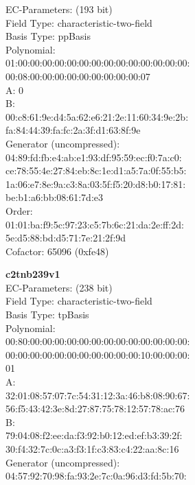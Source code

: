 EC-Parameters: (193 bit)\\
Field Type: characteristic-two-field\\
Basis Type: ppBasis\\
Polynomial:\\
    01:00:00:00:00:00:00:00:00:00:00:00:00:00:00:\\
    00:08:00:00:00:00:00:00:00:00:00:07\\
A:    0\\
B:   \\
    00:c8:61:9e:d4:5a:62:e6:21:2e:11:60:34:9e:2b:\\
    fa:84:44:39:fa:fc:2a:3f:d1:63:8f:9e\\
Generator (uncompressed):\\
    04:89:fd:fb:e4:ab:e1:93:df:95:59:ec:f0:7a:c0:\\
    ce:78:55:4e:27:84:eb:8c:1e:d1:a5:7a:0f:55:b5:\\
    1a:06:e7:8e:9a:c3:8a:03:5f:f5:20:d8:b0:17:81:\\
    be:b1:a6:bb:08:61:7d:e3\\
Order: \\
    01:01:ba:f9:5c:97:23:c5:7b:6c:21:da:2e:ff:2d:\\
    5e:d5:88:bd:d5:71:7e:21:2f:9d\\
Cofactor:  65096 (0xfe48)\\
\item \textbf{ c2tnb239v1 }\\
EC-Parameters: (238 bit)\\
Field Type: characteristic-two-field\\
Basis Type: tpBasis\\
Polynomial:\\
    00:80:00:00:00:00:00:00:00:00:00:00:00:00:00:\\
    00:00:00:00:00:00:00:00:00:00:00:10:00:00:00:\\
    01\\
A:   \\
    32:01:08:57:07:7c:54:31:12:3a:46:b8:08:90:67:\\
    56:f5:43:42:3e:8d:27:87:75:78:12:57:78:ac:76\\
B:   \\
    79:04:08:f2:ee:da:f3:92:b0:12:ed:ef:b3:39:2f:\\
    30:f4:32:7c:0c:a3:f3:1f:c3:83:c4:22:aa:8c:16\\
Generator (uncompressed):\\
    04:57:92:70:98:fa:93:2e:7c:0a:96:d3:fd:5b:70:\\
